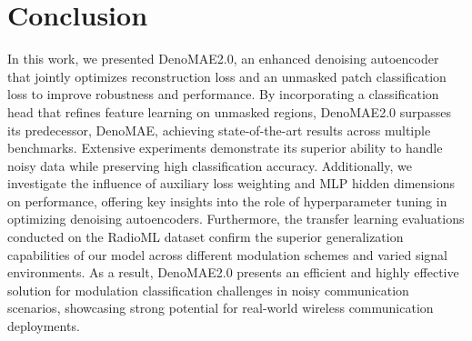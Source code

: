 \section{Conclusion}

In this work, we presented DenoMAE2.0, an enhanced denoising autoencoder that jointly optimizes reconstruction loss and an unmasked patch classification loss to improve robustness and performance. By incorporating a classification head that refines feature learning on unmasked regions, DenoMAE2.0 surpasses its predecessor, DenoMAE, achieving state-of-the-art results across multiple benchmarks. Extensive experiments demonstrate its superior ability to handle noisy data while preserving high classification accuracy. Additionally, we investigate the influence of auxiliary loss weighting and MLP hidden dimensions on performance, offering key insights into the role of hyperparameter tuning in optimizing denoising autoencoders.  Furthermore, the transfer learning evaluations conducted on the RadioML dataset confirm the superior generalization capabilities of our model across different modulation schemes and varied signal environments. As a result, DenoMAE2.0 presents an efficient and highly effective solution for modulation classification challenges in noisy communication scenarios, showcasing strong potential for real-world wireless communication deployments.


